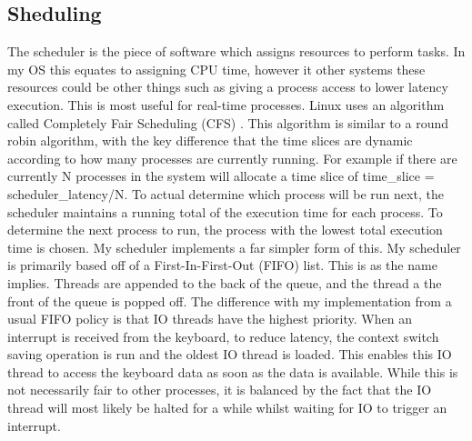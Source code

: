 \subsection{Sheduling}
The scheduler is the piece of software which assigns resources to perform tasks. In my OS this equates to assigning CPU time, however it other systems these resources could be other things such as giving a process access to lower latency execution. This is most useful for real-time processes. Linux uses an algorithm called Completely Fair Scheduling (CFS) \cite{CFS}. This algorithm is similar to a round robin algorithm, with the key difference that the time slices are dynamic according to how many processes are currently running. For example if there are currently N processes in the system will allocate a time slice of time\_slice = scheduler\_latency/N. To actual determine which process will be run next, the scheduler maintains a running total of the execution time for each process. To determine the next process to run, the process with the lowest total execution time is chosen. 
My scheduler implements a far simpler form of this. My scheduler is primarily based off of a First-In-First-Out (FIFO) list. This is as the name implies. Threads are appended to the back of the queue, and the thread a the front of the queue is popped off. The difference with my implementation from a usual FIFO policy is that IO threads have the highest priority. When an interrupt is received from the keyboard, to reduce latency, the context switch saving operation is run and the oldest IO thread is loaded. This enables this IO thread to access the keyboard data as soon as the data is available. While this is not necessarily fair to other processes, it is balanced by the fact that the IO thread will most likely be halted for a while whilst waiting for IO to trigger an interrupt. 

